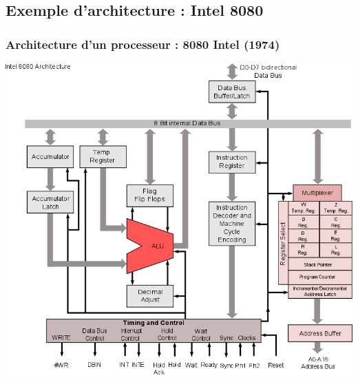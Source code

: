 \documentclass{beamer}
\begin{document}
\subsection{Exemple d'architecture : Intel 8080}
\begin{frame}
\frametitle{Architecture d'un processeur : 8080 Intel (1974)}

\begin{center}
\includegraphics[width=0.7\linewidth]{Historique/8080.png}
\end{center}
\end{frame}
\end{document}
